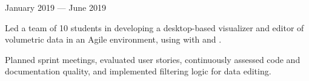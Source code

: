 \begin{cventries}
{\begin{cvitems}
	\end{cvitems}
}
{January 2019 --- June 2019} %
{%
	\begin{cvitems}
	\item Led a team of 10 students in developing a desktop-based visualizer and editor of volumetric data in an Agile environment, using  with  and .
	\item Planned sprint meetings, evaluated user stories, continuously assessed code and documentation quality, and implemented filtering logic for data editing.
	\end{cvitems}
}
\end{cventries}
